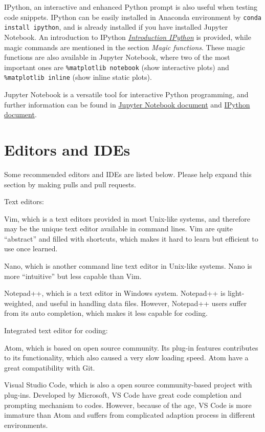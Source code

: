\documentclass[english]{../TeXTemplate/pkupaper}
\begin{document}
IPython, an interactive and enhanced Python prompt is also useful when testing code snippets. IPython can be easily installed in Anaconda environment by \verb"conda install ipython", and is already installed if you have installed Jupyter Notebook. An introduction to IPython \href{https://ipython.readthedocs.io/en/stable/interactive/tutorial.html}{\emph{Introduction IPython}} is provided, while magic commands are mentioned in the section \emph{Magic functions}. These magic functions are also available in Jupyter Notebook, where two of the most important ones are \verb"%matplotlib notebook" (show interactive plots) and \verb"%matplotlib inline" (show inline static plots).

Jupyter Notebook is a versatile tool for interactive Python programming, and further information can be found in \href{https://jupyter-notebook.readthedocs.io/en/stable/index.html}{Jupyter Notebook document} and \href{https://ipython.readthedocs.io/en/stable/index.html}{IPython document}.

\section{Editors and IDEs}

Some recommended editors and IDEs are listed below. Please help expand this section by making pulls and pull requests.

Text editors:
\begin{partlist}
\item Vim, which is a text editors provided in most Unix-like systems, and therefore may be the unique text editor available in command lines. Vim are quite ``abstract'' and filled with shortcuts, which makes it hard to learn but efficient to use once learned.
\item Nano, which is another command line text editor in Unix-like systems. Nano is more ``intuitive'' but less capable than Vim.
\item Notepad++, which is a text editor in Windows system. Notepad++ is light-weighted, and useful in handling data files. However, Notepad++ users suffer from its auto completion, which makes it less capable for coding.
\end{partlist}

Integrated text editor for coding:
\begin{partlist}
\item Atom, which is based on open source community. Its plug-in features contributes to its functionality, which also caused a very slow loading speed. Atom have a great compatibility with Git.
\item Visual Studio Code, which is also a open source community-based project with plug-ins. Developed by Microsoft, VS Code have great code completion and prompting mechanism to codes. However, because of the age, VS Code is more immature than Atom and suffers from complicated adaption process in different environments.
\end{partlist}
\end{document}

